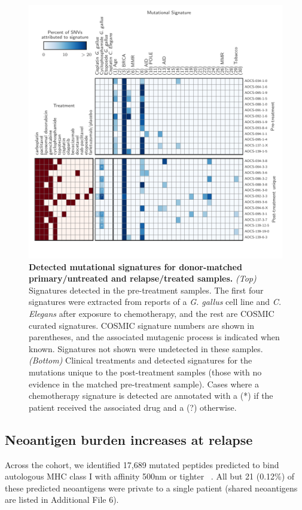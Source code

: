 \begin{figure}[htbp]
\centering
\includegraphics[scale=1.0]{figures/signatures.pdf}
\caption{\textbf{Detected mutational signatures for donor-matched primary/untreated and relapse/treated samples.} \textit{(Top)} Signatures detected in the pre-treatment samples. The first four signatures were extracted from reports of a \textit{G. gallus} cell line and \textit{C. Elegans} after exposure to chemotherapy, and the rest are COSMIC curated signatures. COSMIC signature numbers are shown in parentheses, and the associated mutagenic process is indicated when known. Signatures not shown were undetected in these samples. \textit{(Bottom)} Clinical treatments and detected signatures for the mutations unique to the post-treatment samples (those with no evidence in the matched pre-treatment sample). Cases where a chemotherapy signature is detected are annotated with a (*) if the patient received the associated drug and a (?) otherwise.}
\label{fig:signatures}
\end{figure}

\subsection*{Neoantigen burden increases at relapse}

Across the cohort, we identified 17,689 mutated peptides predicted to bind autologous MHC class I with affinity 500nm or tighter ~\cite{Sette1994}. All but 21 (0.12\%) of these predicted neoantigens were private to a single patient (shared neoantigens are listed in Additional File 6).

